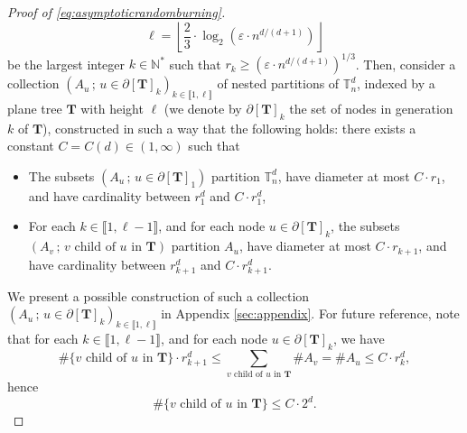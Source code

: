 \documentclass[a4paper,11pt]{article}
\begin{document}
\begin{proof}[Proof of \eqref{eq:asymptoticrandomburning}]
\[\ell=\left\lfloor\frac{2}{3}\cdot\log_2\left(\varepsilon\cdot n^{d/(d+1)}\right)\right\rfloor\]
be the largest integer $k\in\mathbb{N}^*$ such that ${r_k\geq\left(\varepsilon\cdot n^{d/(d+1)}\right)^{1/3}}$.
Then, consider a collection $\left(A_u\,;\,u\in\partial[\mathbf{T}]_k\right)_{k\in\llbracket1,\ell\rrbracket}$ of nested partitions of $\mathbb{T}_n^d$, indexed by a plane tree $\mathbf{T}$ with height $\ell$ (we denote by $\partial[\mathbf{T}]_k$ the set of nodes in generation $k$ of $\mathbf{T}$), constructed in such a way that the following holds: there exists a constant $C=C(d)\in(1,\infty)$ such that
\begin{itemize}
\item The subsets $\left(A_u\,;\,u\in\partial[\mathbf{T}]_1\right)$ partition $\mathbb{T}_n^d$, have diameter at most $C\cdot r_1$, and have cardinality between $r_1^d$ and $C\cdot r_1^d$,

\item For each $k\in\llbracket1,\ell-1\rrbracket$, and for each node $u\in\partial[\mathbf{T}]_k$, the subsets $\left(A_v\,;\,\text{$v$ child of $u$ in $\mathbf{T}$}\right)$ partition $A_u$, have diameter at most $C\cdot r_{k+1}$, and have cardinality between $r_{k+1}^d$ and $C\cdot r_{k+1}^d$.
\end{itemize}
We present a possible construction of such a collection ${(A_u\,;\,u\in\partial[\mathbf{T}]_k)_{k\in\llbracket1,\ell\rrbracket}}$ in Appendix \ref{sec:appendix}.
For future reference, note that for each ${k\in\llbracket1,\ell-1\rrbracket}$, and for each node $u\in\partial[\mathbf{T}]_k$, we have
\[\#\{\text{$v$ child of $u$ in $\mathbf{T}$}\}\cdot r_{k+1}^d\leq\sum_{\text{$v$ child of $u$ in $\mathbf{T}$}}\#A_v=\#A_u\leq C\cdot r_k^d,\]
hence
\begin{equation}\label{eq:childrenu}
\#\{\text{$v$ child of $u$ in $\mathbf{T}$}\}\leq C\cdot2^d.
\end{equation}


\end{proof}
\end{document}
